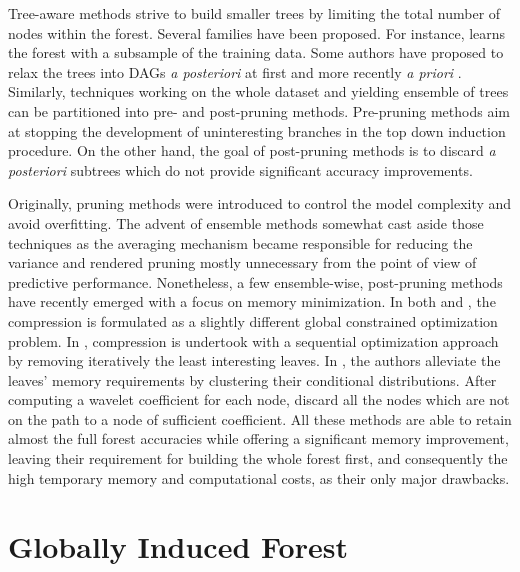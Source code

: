 \documentclass{article}
\begin{document}
Tree-aware methods strive to build smaller trees by limiting the total number
of nodes within the forest. Several families have been proposed. For instance,
\citet{breiman1999pasting} learns the forest with a subsample of the training
data. Some authors have proposed to relax the trees into DAGs {\it a
  posteriori} at first \citep[e.g.,][]{peterson2009dag} and more recently {\it
  a priori} \cite{shotton2013jungle}.  Similarly, techniques working on the
whole dataset and yielding ensemble of trees can be partitioned into pre- and
post-pruning methods. Pre-pruning methods aim at stopping the development of
uninteresting branches in the top down induction procedure. On the other hand,
the goal of post-pruning methods is to discard {\it a posteriori} subtrees which
do not provide significant accuracy improvements.

Originally, pruning methods were introduced to control the model complexity and
avoid overfitting. The advent of ensemble methods somewhat cast aside those
techniques as the averaging mechanism became responsible for reducing the
variance and rendered pruning mostly unnecessary from the point of view of
predictive performance. Nonetheless, a few ensemble-wise, post-pruning methods
have recently emerged with a focus on memory minimization. In both
\cite{meinshausen2009forestgarrote} and \cite{l1basedcomp}, the compression is
formulated as a slightly different global constrained optimization problem.  In
\cite{ren2015glorefinement}, compression is undertook with a sequential
optimization approach by removing iteratively the least interesting leaves.  In
\cite{vleeschouwer2015mitimemreq}, the authors alleviate the leaves' memory
requirements by clustering their conditional distributions. After computing a
wavelet coefficient for each node, \citet{elisha2016wavelet} discard all the
nodes which are not on the path to a node of sufficient coefficient.  All these
methods are able to retain almost the full forest accuracies while offering a
significant memory improvement, leaving their requirement for building the
whole forest first, and consequently the high temporary memory and
computational costs, as their only major drawbacks.

\section{Globally Induced Forest}
\label{sec:gif}
\end{document}
